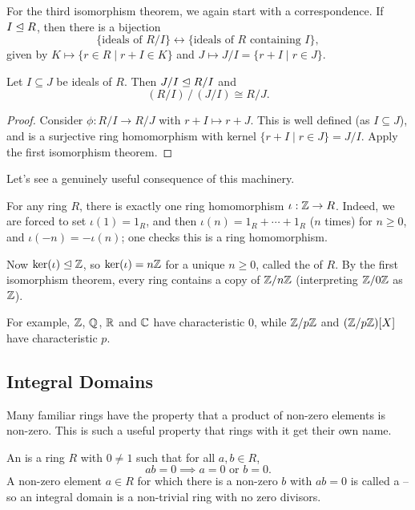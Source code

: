 \documentclass[a4paper]{scrartcl}
\begin{document}
For the third isomorphism theorem, we again start with a correspondence. If $I \trianglelefteq R$, then there is a bijection
$$
\{\text{ideals of } R/I\} \longleftrightarrow \{\text{ideals of } R \text{ containing } I\},
$$
given by $K \mapsto \{r \in R \mid r + I \in K\}$ and $J \mapsto J/I = \{r + I \mid r \in J\}$.

\begin{theorem}
	Let $I \subseteq J$ be ideals of $R$. Then $J/I \trianglelefteq R/I$ and
	$$
	(R/I)\,/\,(J/I) \cong R/J.
	$$
\end{theorem}
\begin{proof}
	Consider $\phi: R/I \rightarrow R/J$ with $r + I \mapsto r + J$. This is well defined (as $I \subseteq J$), and is a surjective ring homomorphism with kernel $\{r + I \mid r \in J\} = J/I$. Apply the first isomorphism theorem.
\end{proof}

Let's see a genuinely useful consequence of this machinery.

\begin{example}
	For any ring $R$, there is exactly one ring homomorphism $\iota : \mathbb{Z} \rightarrow R$. Indeed, we are forced to set $\iota(1) = 1_R$, and then $\iota(n) = 1_R + \cdots + 1_R$ ($n$ times) for $n \geq 0$, and $\iota(-n) = -\iota(n)$; one checks this is a ring homomorphism.

	Now $\operatorname{ker}(\iota) \trianglelefteq \mathbb{Z}$, so $\operatorname{ker}(\iota) = n\mathbb{Z}$ for a unique $n \geq 0$, called the  of $R$. By the first isomorphism theorem, every ring contains a copy of $\mathbb{Z}/n\mathbb{Z}$ (interpreting $\mathbb{Z}/0\mathbb{Z}$ as $\mathbb{Z}$).

	For example, $\mathbb{Z}$, $\mathbb{Q}$, $\mathbb{R}$ and $\mathbb{C}$ have characteristic $0$, while $\mathbb{Z}/p\mathbb{Z}$ and $(\mathbb{Z}/p\mathbb{Z})[X]$ have characteristic $p$.
\end{example}

\subsection{Integral Domains}

Many familiar rings have the property that a product of non-zero elements is non-zero. This is such a useful property that rings with it get their own name.

\begin{definition}
	An  is a ring $R$ with $0 \neq 1$ such that for all $a, b \in R$,
	$$
	ab = 0 \implies a = 0 \text{ or } b = 0.
	$$
	A non-zero element $a \in R$ for which there is a non-zero $b$ with $ab = 0$ is called a  -- so an integral domain is a non-trivial ring with no zero divisors.
\end{definition}
\end{document}
